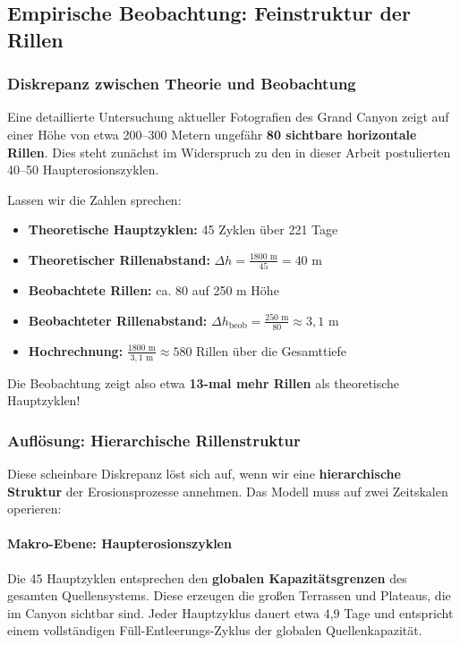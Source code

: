 ﻿\subsection{Empirische Beobachtung: Feinstruktur der Rillen}

\subsubsection{Diskrepanz zwischen Theorie und Beobachtung}

Eine detaillierte Untersuchung aktueller Fotografien des Grand Canyon zeigt auf einer Höhe von etwa 200--300 Metern ungefähr \textbf{80 sichtbare horizontale Rillen}. Dies steht zunächst im Widerspruch zu den in dieser Arbeit postulierten 40--50 Haupterosionszyklen.

Lassen wir die Zahlen sprechen:

\begin{itemize}
	\item \textbf{Theoretische Hauptzyklen:} 45 Zyklen über 221 Tage
	\item \textbf{Theoretischer Rillenabstand:} $\Delta h = \frac{1800 \text{ m}}{45} = 40$ m
	\item \textbf{Beobachtete Rillen:} ca. 80 auf 250 m Höhe
	\item \textbf{Beobachteter Rillenabstand:} $\Delta h_{\text{beob}} = \frac{250 \text{ m}}{80} \approx 3{,}1$ m
	\item \textbf{Hochrechnung:} $\frac{1800 \text{ m}}{3{,}1 \text{ m}} \approx 580$ Rillen über die Gesamttiefe
\end{itemize}

Die Beobachtung zeigt also etwa \textbf{13-mal mehr Rillen} als theoretische Hauptzyklen!

\subsubsection{Auflösung: Hierarchische Rillenstruktur}

Diese scheinbare Diskrepanz löst sich auf, wenn wir eine \textbf{hierarchische Struktur} der Erosionsprozesse annehmen. Das Modell muss auf zwei Zeitskalen operieren:

\paragraph{Makro-Ebene: Haupterosionszyklen}

Die 45 Hauptzyklen entsprechen den \textbf{globalen Kapazitätsgrenzen} des gesamten Quellensystems. Diese erzeugen die großen Terrassen und Plateaus, die im Canyon sichtbar sind. Jeder Hauptzyklus dauert etwa 4,9 Tage und entspricht einem vollständigen Füll-Entleerungs-Zyklus der globalen Quellenkapazität.

